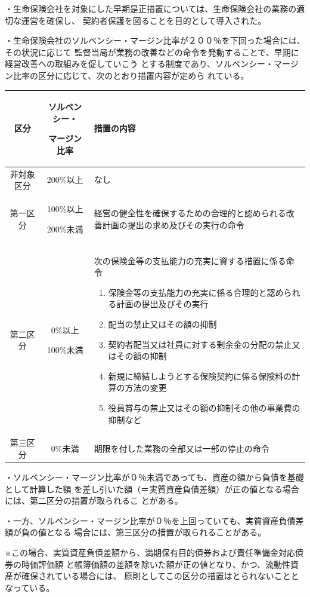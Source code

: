 \documentclass[report,gutter=10mm,fore-edge=10mm,uplatex,dvipdfmx]{jlreq}
\begin{document}
\answer{}
・生命保険会社を対象にした早期是正措置については、生命保険会社の業務の適切な運営を確保し、
契約者保護を図ることを目的として導入された。

・生命保険会社のソルベンシー・マージン比率が２００％を下回った場合には、その状況に応じて
監督当局が業務の改善などの命令を発動することで、早期に経営改善への取組みを促していこう
とする制度であり、ソルベンシー・マージン比率の区分に応じて、次のとおり措置内容が定めら
れている。
\begin{tabularx}{\textwidth}{|c|c|X|}
\hline
 区分&ソルベンシー・\par マージン比率&措置の内容\\ \hline
 非対象区分& 200\%以上&なし\\ \hline
 第一区分& 100\%以上\par 200\%未満&経営の健全性を確保するための合理的と認められる改善計画の提出の求め及びその実行の命令\\ \hline
第二区分& 0\%以上\par 100\%未満&次の保険金等の支払能力の充実に資する措置に係る命令
\begin{enumerate}[(1)]
 \item 保険金等の支払能力の充実に係る合理的と認められる計画の提出及びその実行
 \item 配当の禁止又はその額の抑制
 \item 契約者配当又は社員に対する剰余金の分配の禁止又はその額の抑制
 \item 新規に締結しようとする保険契約に係る保険料の計算の方法の変更
 \item 役員賞与の禁止又はその額の抑制その他の事業費の抑制など
\end{enumerate}\\ \hline
第三区分& 0\%未満&期限を付した業務の全部又は一部の停止の命令\\ \hline
\end{tabularx}

・ソルベンシー・マージン比率が０％未満であっても、資産の額から負債を基礎として計算した額
を差し引いた額（＝実質資産負債差額）が正の値となる場合には、第二区分の措置が取られるこ
とがある。

・一方、ソルベンシー・マージン比率が０％を上回っていても、実質資産負債差額が負の値となる
場合には、第三区分の措置が取られることがある。

※この場合、実質資産負債差額から、満期保有目的債券および責任準備金対応債券の時価評価額
と帳簿価額の差額を除いた額が正の値となり、かつ、流動性資産が確保されている場合には、
原則としてこの区分の措置はとられないこととなっている。
\end{document}
